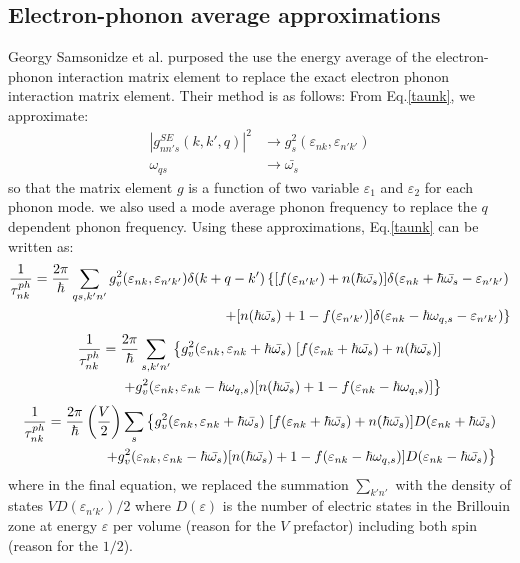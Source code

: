 \documentclass{article}
\begin{document}
\subsection{Electron-phonon average approximations}
Georgy Samsonidze et al. purposed the use the energy average of the electron-phonon
interaction matrix element to replace the exact electron phonon interaction matrix 
element. Their method is as follows:
From Eq.\ref{taunk}, we approximate:
\begin{align}
    |g_{nn's}^{SE}(k,k',q)|^2 &\to g_s^2 (\varepsilon_{nk}, \varepsilon_{n'k'}) \\
    \omega_{qs} &\to \bar{\omega_s}
\end{align}
so that the matrix element $g$ is a function of two variable $\varepsilon_1$ and $\varepsilon_2$ for each phonon mode. 
we also used a mode average phonon frequency to replace the $q$ dependent phonon frequency. Using these approximations, Eq.\ref{taunk}
can be written as:
\begin{align}
    \frac{1}{\tau_{nk}^{ph}} = \frac{2\pi}{\hbar} \sum_{qs,k'n'} g_v^2 (\varepsilon_{nk}, \varepsilon_{n'k'}) \delta(k+q-k')
    \left\{ [ f(\varepsilon_{n'k'}) + n(\hbar\bar{\omega_s}) ]\delta(\varepsilon_{nk} + \hbar\bar{\omega_s} - \varepsilon_{n'k'}) \right. \notag \\
           \left. + [ n(\hbar\bar{\omega_s}) + 1 - f(\varepsilon_{n'k'}) ] \delta(\varepsilon_{nk} - \hbar\omega_{q,s} - \varepsilon_{n'k'})\right\} 
\end{align}
\begin{align}
    \frac{1}{\tau_{nk}^{ph}} =  \frac{2\pi}{\hbar} \sum_{s,k'n'} \left\{ g_v^2 (\varepsilon_{nk}, \varepsilon_{nk}+\hbar\bar{\omega_s}) \right.
    [ f(\varepsilon_{nk}+\hbar\bar{\omega_s}) + n(\hbar\bar{\omega_s}) ] \notag \\
           \left. + g_v^2 (\varepsilon_{nk}, \varepsilon_{nk} - \hbar\omega_{q,s}) [ n(\hbar\bar{\omega_s}) + 1 - f(\varepsilon_{nk} - \hbar\omega_{q,s}) ] \right\}  
\end{align}
\begin{align}
    \frac{1}{\tau_{nk}^{ph}}=  \frac{2\pi}{\hbar} \left( \frac{V}{2} \right) \sum_{s} \left\{ g_v^2 (\varepsilon_{nk}, \varepsilon_{nk}+\hbar\bar{\omega_s}) \right.
     [ f(\varepsilon_{nk}+\hbar\bar{\omega_s}) + n(\hbar\bar{\omega_s}) ] D(\varepsilon_{nk}+\hbar\bar{\omega_s}) \notag \\
            \left. + g_v^2 (\varepsilon_{nk}, \varepsilon_{nk} - \hbar\bar{\omega_s}) [ n(\hbar\bar{\omega_s}) + 1 - f(\varepsilon_{nk} - \hbar\omega_{q,s}) ]  D(\varepsilon_{nk}-\hbar\bar{\omega_s}) \right\} 
\end{align}
where in the final equation, we replaced the summation $\sum_{k'n'}$ with the density of states $V D(\varepsilon_{n'k'})/2$ where
$D(\varepsilon)$ is the number of electric states in the Brillouin zone at energy $\varepsilon$ per volume (reason for the $V$ prefactor)
including both spin (reason for the $1/2$).
\end{document}
